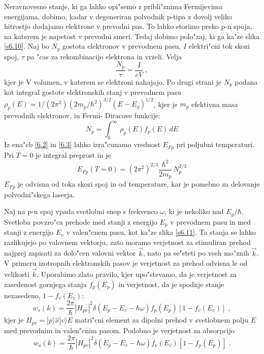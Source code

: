 Neravnovesno stanje, ki ga lahko opi"semo z pribli"znima Fermijevima
energijama, dobimo, kadar v degeneriran polvodnik p-tipa z dovolj veliko
hitrostjo dodajamo elektrone v prevodni pas. To lahko storimo preko p-n
spoja, na katerem je napetost v prevodni smeri. Tedaj dobimo polo"zaj, ki ga
ka"ze slika \ref{s6.10}. Naj bo $N_p$ gostota elektronov v prevodnem pasu, $I
$ elektri"cni tok skozi spoj, $\tau$ pa "cas za rekombinacijo elektrona in
vrzeli. Velja 
\begin{equation}  \label{6.2}
\frac{N_p}{\tau}=\frac{I}{e V}\;,
\end{equation}
kjer je V volumen, v katerem se elektroni nahajajo. Po drugi strani je $N_p$
podana kot integral gostote elektronskih stanj v prevodnem pasu $%
\rho_p(E)=1/(2\pi^2)(2m_p/\hbar^2)^{3/2}(E-E_g)^{1/2}$, kjer je $m_p$
efektivna masa prevodnih elektronov, in Fermi- Diracove funkcije: 
\begin{equation}  \label{6.3}
N_p=\int_{0}^{\infty}\,\rho_p(E)f_p(E)\,dE
\end{equation}
Iz ena"cb \ref{6.2} in \ref{6.3} lahko izra"cunamo vrednost $E_{Fp}$ pri
poljubni temperaturi. Pri $T=0$ je integral preprost in je 
\begin{equation}  \label{6.4}
E_{Fp}(T=0)=(2\pi^2)^{2/3}\frac{\hbar^2}{2m_p}\,N_p^{2/3}
\end{equation}
$E_{Fp}$ je odvisna od toka skozi spoj in od temperature, kar je pomebno za
delovanje polvodni"skega laserja.

Naj na p-n spoj vpada svetlobni snop s frekvenco $\omega$, ki je nekoliko
nad $E_g/\hbar$. Svetloba povzro"ca prehode med stanji z energijo $E_p$ v
prevodnem pasu in med stanji z energijo $E_v$ v valen"cnem pasu, kot ka"ze
slika \ref{s6.11}. Ta stanja se lahko razlikujejo po valovnem vektorju, zato
moramo verjetnost za stimuliran prehod najprej zapisati za dolo"cen valovni
vektor $\vec{k}$, nato pa se"steti po vseh mo"znih $\vec{k}$. V primeru
izotropnih elektronskih pasov je verjetnost za prehod odvisna le od
velikosti $\vec{k}$. Uporabimo zlato pravilo, kjer upo"stevamo, da je
verjetnost za zasedenost gornjega stanja $f_p(E_p)$ in verjetnost, da je
spodnje stanje nezasedeno, $1-f_v(E_v)$: 
\begin{equation}  \label{6.5}
w_s(k)=\frac{2\pi}{\hbar}|H_{pv}|^2\delta(E_p-E_v- \hbar\omega)
f_p(E_p)[1-f_v(E_v)]\;,
\end{equation}
kjer je $H_{pv}= |p\rangle \hat{x}|v\rangle E $ matri"cni element za dipolni
prehod v svetlobnem polju $E$ med prevodnim in valen"cnim pasom. Podobno je
verjetnost za absorpcijo 
\begin{equation}  \label{6.6}
w_a(k)=\frac{2\pi}{\hbar}|H_{pv}|^2\delta(E_p-E_v- \hbar\omega)
f_v(E_v)[1-f_p(E_p)]\;.
\end{equation}

